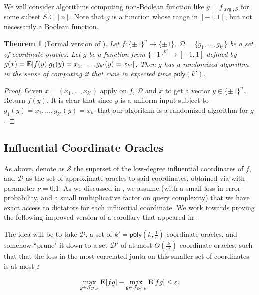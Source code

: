 \documentclass[10pt,a4paper]{article}
\providecommand{\poly}{\mathsf{poly}}
\theoremstyle{plain}
\newtheorem{theorem}{Theorem}[section]
\theoremstyle{remark}
\theoremstyle{plain}
\providecommand{\E}{}
\renewcommand{\E}{\mathop{\bf E\/}}
\newcommand{\pmone}{\{\pm 1\}}
\newcommand{\calS}{\mathcal{S}}
\newcommand{\avg}{\operatorname{avg}}
\newcommand{\InfluentialCoords}{\calS}
\newcommand{\InfluentialOracles}{\mathcal{D}}
\newcommand{\Juntas}[2]{\mathcal{J}_{#1, #2}}
\renewcommand{\epsilon}{\varepsilon}
\begin{document}
We will consider algorithms computing non-Boolean function like $g = f_{\avg, S}$ for some subset $S \subseteq [n]$. Note that $g$ is a function whose range in $[-1,1]$, but not necessarily a Boolean function.
\begin{theorem}[Formal version of ]
\label{theorem:implicit-junta-access}
	Let $f: \pmone^n \to \pmone$, $\InfluentialOracles = \{g_1, \ldots, g_{k'}\}$ be a set of coordinate oracles.
	Let $g$ be a function from $\pmone^{k'} \to [-1,1]$ defined by $g(x) = \E[f(y) | g_1(y)=x_1, \ldots, g_{k'}(y)=x_{k'}]$. Then $g$ has a randomized algorithm in the sense of  computing it that runs in expected time $\poly(k')$. 
\end{theorem}
\begin{proof}
	Given $x = (x_1, \ldots,x_{k'})$ apply  on $f$, $\InfluentialOracles$ and $x$ to get a vector $y\in \pmone^n$. Return $f(y)$.
	It is clear that since $y$ is a uniform input subject to $g_1(y)=x_1, \ldots, g_{k'}(y)=x_{k'}$ that our algorithm is a randomized algorithm for $g$.
\end{proof}

\subsection{Influential Coordinate Oracles}

 As above, denote as $\InfluentialCoords$ the  superset of the low-degree influential coordinates of $f$, and $\InfluentialOracles$ as the set of approximate oracles to said coordinates, obtained via  with parameter $\nu = 0.1$. As we discussed in , we assume (with a small loss in error probability, and a small multiplicative factor on query complexity) that we have exact access to dictators for each influential coordinate. We work towards proving the following improved version of a corollary that appeared in \cite{junta-coordinate-oracles}:

 The idea will be to take $\InfluentialOracles$, a set of $k' = \poly\left(k, \frac{1}{\epsilon}\right)$ coordinate oracles, and somehow ``prune" it down to a set  $\InfluentialOracles'$ of at most $O(\frac{k}{\epsilon^2})$ coordinate oracles, such that that the loss in the most correlated junta on this smaller set of coordinates is at most $\epsilon$ 

$$\max_{g \in \Juntas{\InfluentialOracles}{k}} \E[fg] - \max_{g \in \Juntas{\InfluentialOracles'}{k}} \E[fg] \leq \epsilon.$$
\end{document}
